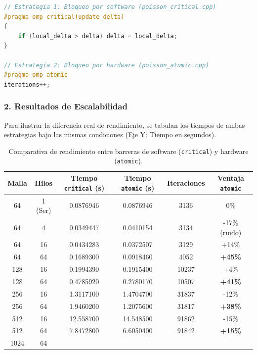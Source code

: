 \documentclass[11pt,a4paper]{article}
\begin{document}
\begin{lstlisting}[language=C++, caption={Comparativa de implementación: critical vs atomic.}, label={lst:act6}]
// Estrategia 1: Bloqueo por software (poisson_critical.cpp)
#pragma omp critical(update_delta)
{
    if (local_delta > delta) delta = local_delta;
}

// Estrategia 2: Bloqueo por hardware (poisson_atomic.cpp)
#pragma omp atomic
iterations++; 
\end{lstlisting}

\subsubsection*{2. Resultados de Escalabilidad}
Para ilustrar la diferencia real de rendimiento, se tabulan los tiempos de ambas estrategias bajo las mismas condiciones (Eje Y: Tiempo en segundos).

\begin{table}[H]
\centering
\renewcommand{\arraystretch}{1.2}
\small
\begin{tabular}{|c|c|c|c|c|c|}
\hline
\textbf{Malla} & \textbf{Hilos} & \textbf{Tiempo \texttt{critical} (s)} & \textbf{Tiempo \texttt{atomic} (s)} & \textbf{Iteraciones} & \textbf{Ventaja \texttt{atomic}} \\ \hline
64 & 1 (Ser) & 0.0876946 & 0.0876946 & 3136 & 0\% \\ 
64 & 4 & 0.0349447 & 0.0410154 & 3134 & -17\% (ruido) \\ 
64 & 16 & 0.0434283 & 0.0372507 & 3129 & +14\% \\ 
64 & 64 & 0.1689300 & 0.0918460 & 4052 & \textbf{+45\%} \\ \hline
128 & 16 & 0.1994390 & 0.1915400 & 10237 & +4\% \\ 
128 & 64 & 0.4785920 & 0.2780170 & 10507 & \textbf{+41\%} \\ \hline
256 & 16 & 1.3117100 & 1.4704700 & 31837 & -12\% \\ 
256 & 64 & 1.9460200 & 1.2075600 & 31817 & \textbf{+38\%} \\ \hline
512 & 16 & 12.558700 & 14.548500 & 91862 & -15\% \\ 
512 & 64 & 7.8472800 & 6.6050400 & 91842 & \textbf{+15\%} \\ \hline
1024 & 64 & & & & \\ \hline
\end{tabular}
\caption{Comparativa de rendimiento entre barreras de software (\texttt{critical}) y hardware (\texttt{atomic}).}
\label{tab:resultados_atomic_critical}
\end{table}
\end{document}
